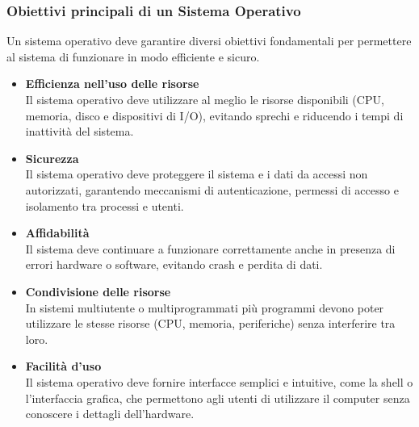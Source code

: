 \documentclass{beamer}
\begin{document}
\begin{frame}
	\frametitle{Obiettivi principali di un Sistema Operativo}
	
	Un sistema operativo deve garantire diversi obiettivi fondamentali
	per permettere al sistema di funzionare in modo efficiente e sicuro.
	
	\begin{itemize}
		
		\item \textbf{Efficienza nell'uso delle risorse} \\
		Il sistema operativo deve utilizzare al meglio le risorse disponibili
		(CPU, memoria, disco e dispositivi di I/O), evitando sprechi e
		riducendo i tempi di inattività del sistema.
		
		\item \textbf{Sicurezza} \\
		Il sistema operativo deve proteggere il sistema e i dati da accessi
		non autorizzati, garantendo meccanismi di autenticazione, permessi
		di accesso e isolamento tra processi e utenti.
		
		\item \textbf{Affidabilità} \\
		Il sistema deve continuare a funzionare correttamente anche in
		presenza di errori hardware o software, evitando crash e perdita
		di dati.
		
		\item \textbf{Condivisione delle risorse} \\
		In sistemi multiutente o multiprogrammati più programmi devono
		poter utilizzare le stesse risorse (CPU, memoria, periferiche)
		senza interferire tra loro.
		
		\item \textbf{Facilità d'uso} \\
		Il sistema operativo deve fornire interfacce semplici e intuitive,
		come la shell o l'interfaccia grafica, che permettono agli utenti
		di utilizzare il computer senza conoscere i dettagli dell'hardware.
		
	\end{itemize}
	
\end{frame}
	
\end{document}
